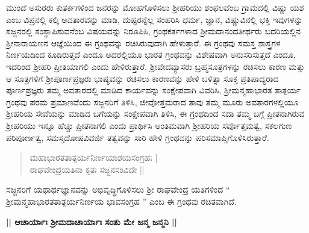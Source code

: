 ಮುಂದೆ ಅಸುರರು ಕುತರ್ಕಗಳಿಂದ ಜನರನ್ನು ಮೋಹಗೊಳಿಸಲು ಶ‍್ರೀಹರಿಯು ಶಂಫಲವೆಂಬ ಗ್ರಾಮದಲ್ಲಿ ವಿಷ್ಣು ಯಶ ಎಂಬ ವಿಪ್ರನಲ್ಲಿ ಕಲ್ಕಿ ಅವತಾರವನ್ನು ಮಾಡಿ, ದುಷ್ಟರನ್ನೆಲ್ಲ ಸಂಹರಿಸಿ ಧರ್ಮ, ಜ್ಞಾನ, ವಿಷ್ಣುವಿನಲ್ಲಿ ಭಕ್ತಿ ಇವುಗಳನ್ನು ಸಜ್ಜನರಲ್ಲಿ ಸಂಸ್ಥಾಪಿಸುವನೆಂಬ ವಿಷಯವನ್ನು ನಿರೂಪಿಸಿ, ಗ್ರಂಥಕರ್ತಗಳಾದ ಶ‍್ರೀಮದಾನಂದತೀರ್ಥರು ಬದರಿಯಲ್ಲಿನ ಶ‍್ರೀನಾರಾಯಣನ ಆಜ್ಞೆಯಿಂದ ಈ ಗ್ರಂಥವನ್ನು ರಚಿಸಿರುವುದಾಗಿ ಹೇಳುತ್ತಾರೆ. ಈ ಗ್ರಂಥವು ಸಮಸ್ತ ಶಾಸ್ತ್ರಗಳ ನಿರ್ಣಯದಿಂದ ಕೂಡಿರುತ್ತದೆ ಎಂದೂ ಅದರಲ್ಲಿಯೂ ಭಾರತ ಗ್ರಂಥವನ್ನು ವಿಶೇಷವಾಗಿ ಅನುಸರಿಸುತ್ತದೆ ಎಂದೂ, ಇದರಿಂದ ಶ‍್ರೀಹರಿ ಪ್ರೀತಿಯಾಗಲಿ ಎಂದು ಹೇಳಿರುತ್ತಾರೆ. ಶ‍್ರೀವೇದವ್ಯಾಸರು ಬ್ರಹ್ಮಸೂತ್ರಗಳನ್ನು ರಚಿಸಲು ಕಾರಣ ಮತ್ತು ಆ ಸೂತ್ರಗಳಿಗೆ ಶ‍್ರೀಪೂರ್ಣಪ್ರಜ್ಞರು ಭಾಷ್ಯವನ್ನು ರಚಿಸಲು ಕಾರಣವನ್ನು ಹೇಳಿ ಬಳಿತ್ಸಾ ಸೂಕ್ತ ಪ್ರತಿಪಾದ್ಯರಾದ ಪೂರ್ಣಪ್ರಜ್ಞರು ತಮ್ಮ ಅವತಾರದಲ್ಲಿ ಮಾಡಿದ ಕಾರ್ಯವನ್ನು ಸಂಕ್ಷೇಪವಾಗಿ ವಿವರಿಸಿ, ಶ‍್ರೀಮನ್ಮಹಾಭಾರತ ತಾತ್ಪರ್ಯ ಗ್ರಂಥವು ಪರಮ ಪ್ರಮಾಣವೆಂದು ಸಜ್ಜನರಿಗೆ ತಿಳಿಸಿ, ಜೀವೋತ್ತಮರಾದ ತಾವು ತಮ್ಮ ಮೂರು ಅವತಾರಗಳಲ್ಲಿಯೂ ಶ‍್ರೀಹರಿಯ ಸೇವೆಯನ್ನು ಮಾಡಿದ ಬಗೆಯನ್ನು ಸಂಕ್ಷೇಪವಾಗಿ ತಿಳಿಸಿ, ಈ ಗ್ರಂಥದಿಂದ ಸದಾ ತಮ್ಮ ಬಗ್ಗೆ ಪ್ರೀತನಾಗಿರುವ ಶ‍್ರೀಹರಿಯು ಇನ್ನೂ ಹೆಚ್ಚು ಪ್ರೀತನಾಗಲಿ ಎಂದು ಪ್ರಾರ್ಥಿಸಿ ಅಂತಿಮವಾಗಿ ಶ‍್ರೀಹರಿಯ ಸರ್ವೊತ್ತಮತ್ವ, ಸಕಲಗುಣ ಪರಿಪೂರ್ಣತ್ವ, ಸಮಸ್ತದೋಷವಿವರ್ಜಿ ತತ್ವವನ್ನು ಸಾರಿ ಹೇಳಿ ಗ್ರಂಥವನ್ನು ಪರಿಸಮಾಪ್ತಿಗೊಳಿಸಿರುತ್ತಾರೆ.

\begin{verse}
ಮಹಾಭಾರತತಾತ್ಪರ್ಯನಿರ್ಣಯಾಶಯಸಂಗ್ರಹಃ |\\ ರಾಘವೇಂದ್ರಯತಿನಾ ಕೃತಃ ಸಜ್ಜನಸಂವಿದೇ ||
\end{verse}

ಸಜ್ಜನರಿಗೆ ಯಥಾರ್ಥಜ್ಞಾನವನ್ನು ಅಭಿವೃದ್ಧಿಗೊಳಿಸಲು ಶ‍್ರೀ ರಾಘವೇಂದ್ರ ಯತಿಗಳಿಂದ “ ಶ‍್ರೀಮನ್ಮಹಾಭಾರತತಾತ್ಪರ್ಯನಿರ್ಣಯ ಭಾವಸಂಗ್ರಹ ” ಎಂಬ ಈ ಗ್ರಂಥವು ರಚಿತವಾಗಿದೆ.

\begin{center}
\textbf{|| ಆಚಾರ್ಯಾಃ ಶ‍್ರೀಮದಾಚಾರ್ಯಾಃ ಸಂತು ಮೇ ಜನ್ಮ ಜನ್ಮನಿ ||}
\end{center}

